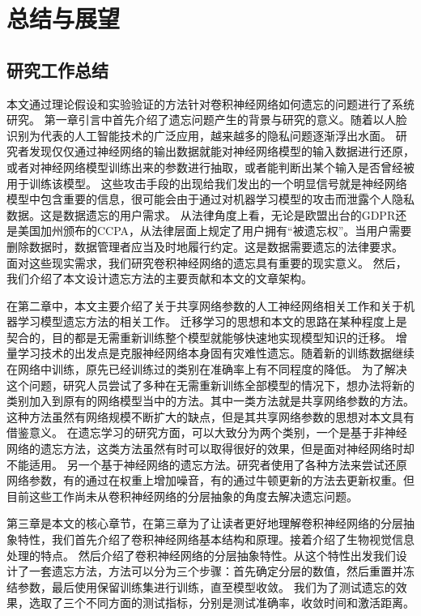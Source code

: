 
\chapter{总结与展望}

\section{研究工作总结}

本文通过理论假设和实验验证的方法针对卷积神经网络如何遗忘的问题进行了系统研究。
第一章引言中首先介绍了遗忘问题产生的背景与研究的意义。随着以人脸识别为代表的人工智能技术的广泛应用，越来越多的隐私问题逐渐浮出水面。
研究者发现仅仅通过神经网络的输出数据就能对神经网络模型的输入数据进行还原，或者对神经网络模型训练出来的参数进行抽取，或者能判断出某个输入是否曾经被用于训练该模型。
这些攻击手段的出现给我们发出的一个明显信号就是神经网络模型中包含重要的信息，很可能会由于通过对机器学习模型的攻击而泄露个人隐私数据。这是数据遗忘的用户需求。
从法律角度上看，无论是欧盟出台的GDPR还是美国加州颁布的CCPA，从法律层面上规定了用户拥有“被遗忘权”。当用户需要删除数据时，数据管理者应当及时地履行约定。这是数据需要遗忘的法律要求。
面对这些现实需求，我们研究卷积神经网络的遗忘具有重要的现实意义。
然后，我们介绍了本文设计遗忘方法的主要贡献和本文的文章架构。

在第二章中，本文主要介绍了关于共享网络参数的人工神经网络相关工作和关于机器学习模型遗忘方法的相关工作。
迁移学习的思想和本文的思路在某种程度上是契合的，目的都是无需重新训练整个模型就能够快速地实现模型知识的迁移。
增量学习技术的出发点是克服神经网络本身固有灾难性遗忘。随着新的训练数据继续在网络中训练，原先已经训练过的类别在准确率上有不同程度的降低。
为了解决这个问题，研究人员尝试了多种在无需重新训练全部模型的情况下，想办法将新的类别加入到原有的网络模型当中的方法。其中一类方法就是共享网络参数的方法。
这种方法虽然有网络规模不断扩大的缺点，但是其共享网络参数的思想对本文具有借鉴意义。
在遗忘学习的研究方面，可以大致分为两个类别，一个是基于非神经网络的遗忘方法，这类方法虽然有时可以取得很好的效果，但是面对神经网络时却不能适用。
另一个基于神经网络的遗忘方法。研究者使用了各种方法来尝试还原网络参数，有的通过在权重上增加噪音，有的通过牛顿更新的方法去更新权重。但目前这些工作尚未从卷积神经网络的分层抽象的角度去解决遗忘问题。

第三章是本文的核心章节，在第三章为了让读者更好地理解卷积神经网络的分层抽象特性，我们首先介绍了卷积神经网络基本结构和原理。接着介绍了生物视觉信息处理的特点。
然后介绍了卷积神经网络的分层抽象特性。从这个特性出发我们设计了一套遗忘方法，方法可以分为三个步骤：首先确定分层的数值，然后重置并冻结参数，最后使用保留训练集进行训练，直至模型收敛。
我们为了测试遗忘的效果，选取了三个不同方面的测试指标，分别是测试准确率，收敛时间和激活距离。


